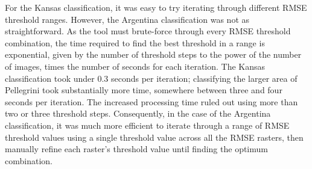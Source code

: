 For the Kansas classification, it was easy to try iterating through different RMSE threshold ranges. However, the Argentina classification was not as straightforward. As the tool must brute-force through every RMSE threshold combination, the time required to find the best threshold in a range is exponential, given by the number of threshold steps to the power of the number of images, times the number of seconds for each iteration. The Kansas classification took under 0.3 seconds per iteration; classifying the larger area of Pellegrini took substantially more time, somewhere between three and four seconds per iteration. The increased processing time ruled out using more than two or three threshold steps. Consequently, in the case of the Argentina classification, it was much more efficient to iterate through a range of RMSE threshold values using a single threshold value across all the RMSE rasters, then manually refine each raster's threshold value until finding the optimum combination.